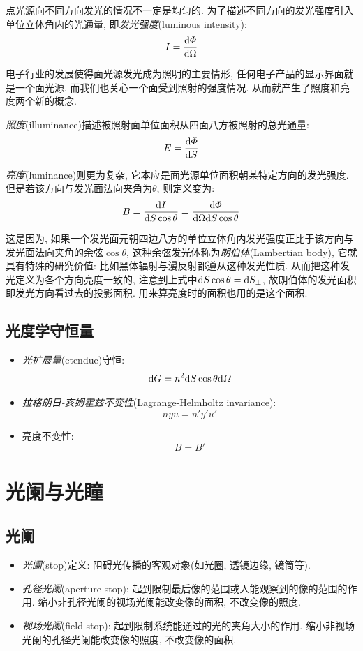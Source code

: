 点光源向不同方向发光的情况不一定是均匀的. 为了描述不同方向的发光强度引入单位立体角内的光通量, 即\emph{发光强度}(luminous intensity):
\[I=\frac{\textrm{d}\varPhi }{\textrm{d} \Omega}\]

电子行业的发展使得面光源发光成为照明的主要情形, 任何电子产品的显示界面就是一个面光源. 而我们也关心一个面受到照射的强度情况. 从而就产生了照度和亮度两个新的概念.

\emph{照度}(illuminance)描述被照射面单位面积从四面八方被照射的总光通量:
\[E=\frac{\textrm{d} \varPhi}{\textrm{d} S}\]

\emph{亮度}(luminance)则更为复杂, 它本应是面光源单位面积朝某特定方向的发光强度. 但是若该方向与发光面法向夹角为$\theta$, 则定义变为:
\[B=\frac{\textrm{d} I}{\textrm{d} S\cos\theta}=\frac{\textrm{d}\varPhi }{\textrm{d} \Omega\textrm{d} S\cos\theta}\]

这是因为, 如果一个发光面元朝四边八方的单位立体角内发光强度正比于该方向与发光面法向夹角的余弦$\cos\theta$, 这种余弦发光体称为\emph{朗伯体}(Lambertian body), 它就具有特殊的研究价值: 比如黑体辐射与漫反射都遵从这种发光性质. 从而把这种发光定义为各个方向亮度一致的, 注意到上式中$\textrm{d} S\cos\theta=\textrm{d} S_{\perp}$, 故朗伯体的发光面积即发光方向看过去的投影面积. 用来算亮度时的面积也用的是这个面积.

\subsection{光度学守恒量}

\begin{itemize}
\item \emph{光扩展量}(etendue)守恒: 
\[\textrm{d} G=n^2 \textrm{d} S \cos\theta \textrm{d} \varOmega\]
\item \emph{拉格朗日-亥姆霍兹不变性}(Lagrange-Helmholtz invariance): 
\[nyu=n'y'u'\]
\item 亮度不变性: 
\[B=B'\]
\end{itemize}


\section{光阑与光瞳}

\subsection{光阑}

\begin{itemize}
\item \emph{光阑}(stop)定义: 阻碍光传播的客观对象(如光圈, 透镜边缘, 镜筒等).
\item \emph{孔径光阑}(aperture stop): 起到限制最后像的范围或人能观察到的像的范围的作用. 缩小非孔径光阑的视场光阑能改变像的面积, 不改变像的照度.
\item \emph{视场光阑}(field stop): 起到限制系统能通过的光的夹角大小的作用. 缩小非视场光阑的孔径光阑能改变像的照度, 不改变像的面积.
\end{itemize}


